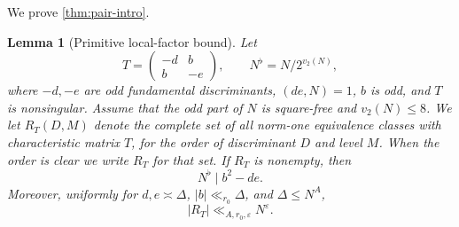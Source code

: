 \documentclass[11pt,reqno]{amsart}
\newtheorem{lemma}[theorem]{Lemma}
\theoremstyle{definition}
\newcommand{\eps}{\varepsilon}
\begin{document}
We prove \cref{thm:pair-intro}.

\begin{lemma}[Primitive local-factor bound]\label{lem:local-factors}
Let
\[
 T=\begin{pmatrix}-d&b\\ b&-e\end{pmatrix},
 \qquad N^\flat=N/2^{v_2(N)},
\]
where $-d,-e$ are odd fundamental discriminants, $(de,N)=1$, $b$ is
odd, and $T$ is nonsingular. Assume that the odd part of $N$ is square-free
and $v_2(N)\leq8$. We let $R_T(D,M)$ denote the complete set of all norm-one equivalence
classes with characteristic matrix $T$, for the order of
discriminant $D$ and level $M$. When the order is clear we write $R_T$ for that set. If $R_T$ is nonempty, then
\begin{equation}\label{eq:n-flat}
 N^\flat\mid b^2-de.
\end{equation}
Moreover, uniformly for $d,e\asymp\Delta$, $|b|\ll_{r_0}\Delta$, and
$\Delta\leq N^A$,
\begin{equation}\label{eq:rt-bound}
 |R_T|\ll_{A,r_0,\eps}N^\eps.
\end{equation}
\end{lemma}
\end{document}
